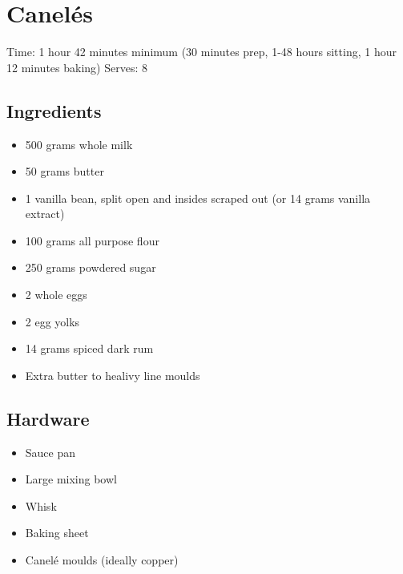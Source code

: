 \section{Canelés}
\label{caneles}
\setcounter{secnumdepth}{0}
Time: 1 hour 42 minutes minimum (30 minutes prep, 1-48 hours sitting, 1 hour 12 minutes baking)
Serves: 8

\begin{multicols}{2}
\subsection*{Ingredients}
\begin{itemize}
    \item 500 grams whole milk
    \item 50 grams butter
    \item 1 vanilla bean, split open and insides scraped out (or 14 grams vanilla extract)
    \item 100 grams all purpose flour
    \item 250 grams powdered sugar
    \item 2 whole eggs
    \item 2 egg yolks
    \item 14 grams spiced dark rum
    \item Extra butter to healivy line moulds
\end{itemize}

\subsection*{Hardware}
\begin{itemize}
    \item Sauce pan
    \item Large mixing bowl
    \item Whisk
    \item Baking sheet
    \item Canelé moulds (ideally copper)
\end{itemize}
\clearpage


\end{multicols}
